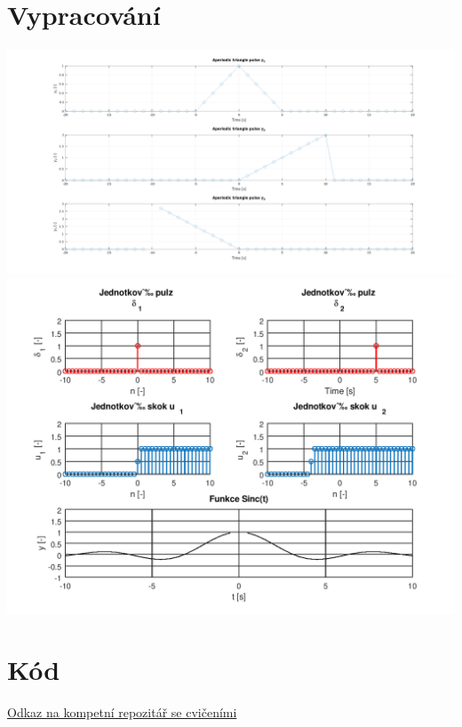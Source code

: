 \documentclass{article}
\begin{document}
	\newpage
\section{Vypracování}
\begin{center}
\includegraphics[scale=0.30]{../assets/img.png}
\\
\includegraphics[scale=0.75]{../assets/img2.png}
\end{center}

\newpage
\section{Kód}

\href{https://github.com/AleshR/AP8ZS}{Odkaz na kompetní repozitář se cvičeními}
\end{document}
